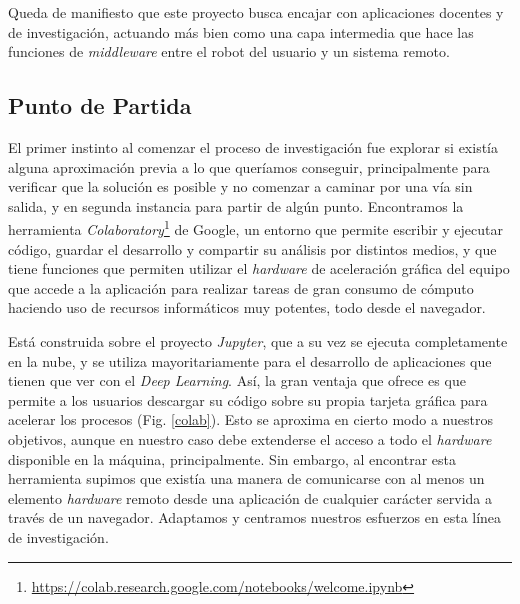Queda de manifiesto que este proyecto busca encajar con aplicaciones docentes y de investigación, actuando más bien como una capa intermedia que hace las funciones de \textit{middleware} entre el robot del usuario y un sistema remoto.

\subsection{Punto de Partida}

El primer instinto al comenzar el proceso de investigación fue explorar si existía alguna aproximación previa a lo que queríamos conseguir, principalmente para verificar que la solución es posible y no comenzar a caminar por una vía sin salida, y en segunda instancia para partir de algún punto. Encontramos la herramienta \textit{Colaboratory}\footnote{\url{https://colab.research.google.com/notebooks/welcome.ipynb}} de Google, un entorno que permite escribir y ejecutar código, guardar el desarrollo y compartir su análisis por distintos medios, y que tiene funciones que permiten utilizar el \textit{hardware} de aceleración gráfica del equipo que accede a la aplicación para realizar tareas de gran consumo de cómputo haciendo uso de recursos informáticos muy potentes, todo desde el navegador. 

Está construida sobre el proyecto \textit{Jupyter}, que a su vez se ejecuta completamente en la nube, y se utiliza mayoritariamente para el desarrollo  de aplicaciones que tienen que ver con el \textit{Deep Learning}. Así, la gran ventaja que ofrece es que permite a los usuarios descargar su código sobre su propia tarjeta gráfica para acelerar los procesos (Fig. \ref{colab}). Esto se aproxima en cierto modo a nuestros objetivos, aunque en nuestro caso debe extenderse el acceso a todo el \textit{hardware} disponible en la máquina, principalmente. Sin embargo, al encontrar esta herramienta supimos que existía una manera de comunicarse con al menos un elemento \textit{hardware} remoto desde una aplicación de cualquier carácter servida a través de un navegador. Adaptamos y centramos nuestros esfuerzos en esta línea de investigación.

